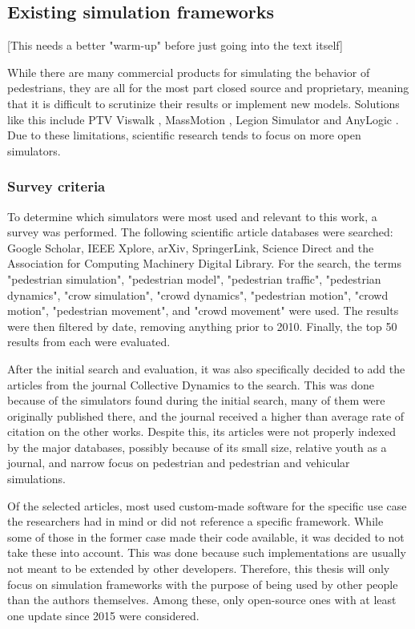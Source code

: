 \documentclass[twoside, 11pt]{article}
\begin{document}
\subsection{Existing simulation frameworks} \label{sec:existing-frameworks}

[This needs a better "warm-up" before just going into the text itself]

While there are many commercial products for simulating the behavior of pedestrians, they are all for the most part closed source and proprietary, meaning that it is difficult to scrutinize their results or implement new models. Solutions like this include PTV Viswalk \cite{viswalk}, MassMotion \cite{massmotion}, Legion Simulator \cite{legionsimulator} and AnyLogic \cite{anylogic}. Due to these limitations, scientific research tends to focus on more open simulators. 

\subsubsection{Survey criteria}

To determine which simulators were most used and relevant to this work, a survey was performed. The following scientific article databases were searched: Google Scholar, IEEE Xplore, arXiv, SpringerLink, Science Direct and the Association for Computing Machinery Digital Library. For the search, the terms "pedestrian simulation", "pedestrian model", "pedestrian traffic", "pedestrian dynamics", "crow simulation", "crowd dynamics", "pedestrian motion", "crowd motion", "pedestrian movement", and "crowd movement" were used.
The results were then filtered by date, removing anything prior to 2010. Finally, the top 50 results from each were evaluated.

After the initial search and evaluation, it was also specifically decided to add the articles from the journal Collective Dynamics to the search. This was done because of the simulators found during the initial search, many of them were originally published there, and the journal received a higher than average rate of citation on the other works. Despite this, its articles were not properly indexed by the major databases, possibly because of its small size, relative youth as a journal, and narrow focus on pedestrian and pedestrian and vehicular simulations. 

Of the selected articles, most used custom-made software for the specific use case the researchers had in mind or did not reference a specific framework. While some of those in the former case made their code available, it was decided to not take these into account. This was done because such implementations are usually not meant to be extended by other developers. Therefore, this thesis will only focus on simulation frameworks with the purpose of being used by other people than the authors themselves. Among these, only open-source ones with at least one update since 2015 were considered. 
\end{document}

